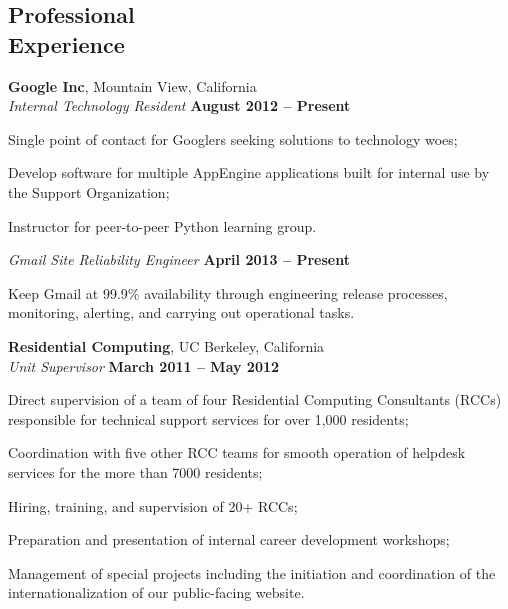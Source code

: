 \documentclass[margin,line]{resume}
\begin{document}
\begin{resume}
	\section{\mysidestyle Professional\\Experience}

	\textbf{Google Inc}, Mountain View, California \vspace{1mm}\\\vspace{0mm}%
	\textsl{Internal Technology Resident} \hfill \textbf{August 2012 -- Present}
	\begin{list2}
		\item Single point of contact for Googlers seeking solutions to technology woes;
		\item Develop software for multiple AppEngine applications built for internal use by the Support Organization;
		\item Instructor for peer-to-peer Python learning group.
	\end{list2}\vspace{-1.5mm}

	\textsl{Gmail Site Reliability Engineer} \hfill \textbf{April 2013 -- Present}
	\begin{list2}
		\item Keep Gmail at 99.9\% availability through engineering release processes, monitoring, alerting, and carrying out operational tasks.
	\end{list2}\vspace{-1.5mm}

	\textbf{Residential Computing}, UC Berkeley, California \vspace{1mm}\\\vspace{0mm}%
	\textsl{Unit Supervisor} \hfill \textbf{March 2011 -- May 2012}
	\begin{list2}
		\item Direct supervision of a team of four Residential Computing Consultants (RCCs) responsible for technical support services for over 1,000 residents;
		\item Coordination with five other RCC teams for smooth operation of helpdesk services for the more than 7000 residents;
		\item Hiring, training, and supervision of 20+ RCCs;
		\item Preparation and presentation of internal career development workshops;
		\item Management of special projects including the initiation and coordination of the internationalization of our public-facing website.
	\end{list2}\vspace{-1.5mm}
	

\end{resume}
\end{document}
